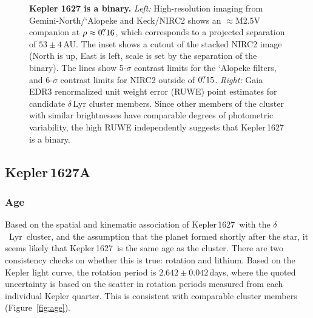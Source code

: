 \documentclass[12pt,modern,twocolumn,tighten,linenumbers,trackchanges]{aastex63}
\newcommand{\cn}{$\delta$\ Lyr\ cluster} %
\newcommand{\sn}{Kepler\,1627} %
\begin{document}
\begin{figure}[tp]
	\begin{center}
		\leavevmode
	\end{center}
	\vspace{-0.5cm}
	\caption{
		{\bf Kepler 1627 is a binary.} {\it Left:} High-resolution imaging
		from Gemini-North/`Alopeke and Keck/NIRC2 shows an $\approx$M2.5V
		companion at $\rho \approx 0\mbox{$.\!\!^{\prime\prime}$}16$, which corresponds to a
		projected separation of $53\pm4$\,AU.  The inset shows a cutout of
		the stacked NIRC2 image (North is up, East is left, scale is set
		by the separation of the binary).  The lines show 5-$\sigma$
		contrast limits for the `Alopeke filters, and 6-$\sigma$ contrast
		limits for NIRC2 outside of $0\mbox{$.\!\!^{\prime\prime}$}15$. {\it Right:} Gaia EDR3
		renormalized unit weight error (RUWE) point estimates for
		candidate $\delta$\,Lyr cluster members.  Since other members of
		the cluster with similar brightnesses have comparable degrees of
		photometric variability, the high RUWE independently suggests that
		Kepler\,1627 is a binary. 
		\label{fig:kep1627binary}
	}
\end{figure}

\subsection{Kepler\,1627A}
\subsubsection{Age}
Based on the spatial and kinematic association of \sn\ with the \cn,
and the assumption that the planet formed shortly after the star, it
seems likely that \sn\ is the same age as the cluster. There are two
consistency checks on whether this is true: rotation and lithium.
Based on the Kepler light curve, the rotation period is
$2.642\pm0.042$\,days, where the quoted uncertainty is based on the
scatter in rotation periods measured from each individual Kepler
quarter.  This is consistent with comparable cluster members
(Figure~\ref{fig:age}).
\end{document}

